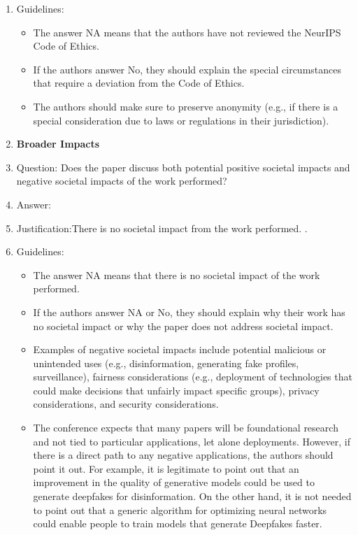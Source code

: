 \documentclass{article}
\begin{document}
\begin{enumerate}
    \item[] Guidelines:
    \begin{itemize}
        \item The answer NA means that the authors have not reviewed the NeurIPS Code of Ethics.
        \item If the authors answer No, they should explain the special circumstances that require a deviation from the Code of Ethics.
        \item The authors should make sure to preserve anonymity (e.g., if there is a special consideration due to laws or regulations in their jurisdiction).
    \end{itemize}


\item {\bf Broader Impacts}
    \item[] Question: Does the paper discuss both potential positive societal impacts and negative societal impacts of the work performed?
    \item[] Answer: \answerNA{} %
    \item[] Justification:There is no societal impact from the work performed.
    .
    \item[] Guidelines:
    \begin{itemize}
        \item The answer NA means that there is no societal impact of the work performed.
        \item If the authors answer NA or No, they should explain why their work has no societal impact or why the paper does not address societal impact.
        \item Examples of negative societal impacts include potential malicious or unintended uses (e.g., disinformation, generating fake profiles, surveillance), fairness considerations (e.g., deployment of technologies that could make decisions that unfairly impact specific groups), privacy considerations, and security considerations.
        \item The conference expects that many papers will be foundational research and not tied to particular applications, let alone deployments. However, if there is a direct path to any negative applications, the authors should point it out. For example, it is legitimate to point out that an improvement in the quality of generative models could be used to generate deepfakes for disinformation. On the other hand, it is not needed to point out that a generic algorithm for optimizing neural networks could enable people to train models that generate Deepfakes faster.

\end{itemize}
\end{enumerate}
\end{document}
